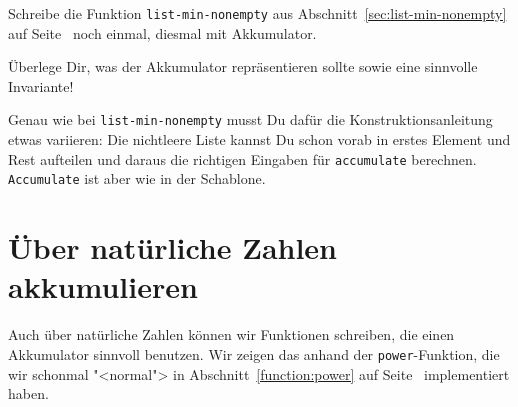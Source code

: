 \begin{aufgabeinline}\label{aufgabe:list-min-nonemepty-acc}
  Schreibe die Funktion \lstinline{list-min-nonempty} aus
  Abschnitt~\ref{sec:list-min-nonempty} auf
  Seite~\pageref{sec:list-min-nonempty} noch einmal, diesmal mit
  Akkumulator.

  Überlege Dir, was der Akkumulator repräsentieren sollte sowie eine
  sinnvolle Invariante!

  Genau wie bei \lstinline{list-min-nonempty} musst Du dafür die
  Konstruktionsanleitung etwas variieren: Die nichtleere Liste kannst
  Du schon vorab in erstes Element und Rest aufteilen und daraus die
  richtigen Eingaben für \lstinline{accumulate} berechnen.
  \lstinline{Accumulate} ist aber wie in der Schablone.
\end{aufgabeinline}
%

\section{Über natürliche Zahlen akkumulieren}

Auch über natürliche Zahlen können wir Funktionen schreiben, die einen
Akkumulator sinnvoll benutzen.  Wir zeigen das anhand der
\lstinline{power}-Funktion, die wir schonmal "<normal"> in
Abschnitt~\ref{function:power} auf Seite~\pageref{function:power}
implementiert haben.

